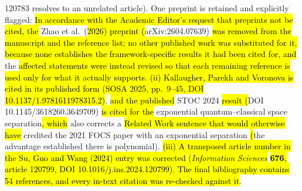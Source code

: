 \documentclass[
  11pt,
]{article}
\providecommand{\DIFadd}[1]{\hl{#1}} %
\providecommand{\DIFdel}[1]{} %
\providecommand{\DIFaddbegin}{} %
\providecommand{\DIFaddend}{} %
\providecommand{\DIFdelbegin}{} %
\providecommand{\DIFdelend}{} %
\providecommand{\DIFaddbegin}{}
\begin{document}
\begin{enumerate}
{  120783 resolves to an unrelated article). One preprint is retained and
  explicitly flagged: }\DIFdelend \DIFaddbegin \DIFadd{In accordance with the Academic
  Editor's request that preprints not be cited, the }\DIFaddend Zhao et al.~(\DIFaddbegin \DIFadd{2026)
  preprint (}\DIFaddend arXiv:2604.07639) \DIFdelbegin \DIFdel{is the framework
  this paper studies; we verified via the
  arXiv record,
  }\DIFdelend \DIFaddbegin \DIFadd{was removed from the manuscript and the
  reference list; no other published work was substituted for it,
  because none establishes the framework-specific results it had been
  cited for, and }\DIFaddend the \DIFdelbegin \DIFdel{authors'
  official listing, and a Crossref registry query that no peer-reviewed
  version exists to date, the entry is labelled ``Preprint'', and every
  invocation of its theorems is co-cited with peer-reviewed anchors
  (Kallaugher, FOCS 2021; Huang et al.}\DIFdelend \DIFaddbegin \DIFadd{affected statements were instead revised so that
  each remaining reference is used only for what it actually supports.
  (ii) Kallaugher, Parekh and Voronova is cited in its published form
  (SOSA 2025, pp.~9--45, DOI 10.1137/1.9781611978315.2)}\DIFaddend , \DIFdelbegin \DIFdel{Science 2022; Kallaugher et al.,
  SOSA 2025). A citation--bibliography consistency check confirms every
  in-text key maps one-to-one onto the bibliography. Following the
  Academic Editor's request that preprints not be cited, the remaining
  preprint's in-text citations were further reduced to the
  attribution-essential minimum, an explicit status footnote was added
  at its first citation in the Introduction, and one further
  peer-reviewed anchor was added and co-cited --- Kallaugher, Parekh and
  Voronova (}\DIFdelend \DIFaddbegin \DIFadd{and the
  published }\DIFaddend STOC 2024 \DIFdelbegin \DIFdel{, }\DIFdelend \DIFaddbegin \DIFadd{result (}\DIFaddend DOI 10.1145/3618260.3649709) \DIFdelbegin \DIFdel{, which establishes
  an }\DIFdelend \DIFaddbegin \DIFadd{is cited for
  the }\DIFaddend exponential quantum--classical space separation\DIFdelbegin \DIFdel{for a natural
  streaming problem (this }\DIFdelend \DIFaddbegin \DIFadd{, which }\DIFaddend also
  corrects a \DIFdelbegin \DIFdel{Related-Work sentence that previously }\DIFdelend \DIFaddbegin \DIFadd{Related Work sentence that would otherwise have }\DIFaddend credited
  the 2021 FOCS paper with an exponential separation \DIFdelbegin \DIFdel{, whereas }\DIFdelend \DIFaddbegin \DIFadd{(}\DIFaddend the advantage
  established there is polynomial). \DIFdelbegin \DIFdel{The bibliography now has 55 entries, consistency re-verified 55↔55; a
  separate response to the Academic Editor accompanies this letter}\DIFdelend \DIFaddbegin \DIFadd{(iii) A transposed article number in
  the Su, Guo and Wang (2024) entry was corrected (}\emph{\DIFadd{Information
  Sciences}} \textbf{\DIFadd{676}}\DIFadd{, article 120799, DOI
  10.1016/j.ins.2024.120799). The final bibliography contains 54
  references, and every in-text citation was re-checked against it}\DIFaddend .
\end{enumerate}
\end{document}
